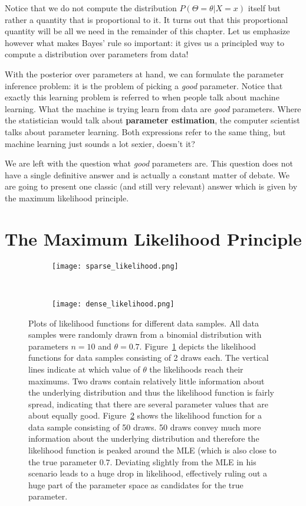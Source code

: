 Notice that we do not compute the distribution $ P(\Theta = \theta|X =x) $ itself but rather a quantity that is proportional to it. It turns out that this proportional quantity will be all
we need in the remainder of this chapter. Let us emphasize however what makes Bayes' rule so important: it gives us a principled way to compute a
distribution over parameters from data!

With the posterior over parameters at hand, we can formulate the parameter inference problem: it is the problem of picking
a \emph{good} parameter. Notice that exactly this learning problem is referred to when people talk about machine learning. What the machine is trying learn from data are \emph{good} parameters. Where the statistician would talk about
\textbf{parameter estimation}, the computer scientist talks about parameter learning. Both expressions refer to the same thing, but machine learning just sounds a lot
sexier, doesn't it?

We are left with the question what \emph{good} parameters are. This question does not have a single definitive answer and is actually a constant matter of debate. We
are going to present one classic (and still very relevant) answer which is given by the maximum likelihood principle.


\section{The Maximum Likelihood Principle}

\begin{figure}
\begin{subfigure}{.45\textwidth}
\texttt{[image: sparse\_likelihood.png]}
\caption{}
\label{fig:sparse_likelihood}
\end{subfigure}
~
\begin{subfigure}{.45\textwidth}
\texttt{[image: dense\_likelihood.png]}
\caption{}
\label{fig:dense_likelihood} 
\end{subfigure}
\caption{Plots of likelihood functions for different data samples. All data samples were randomly drawn
from a binomial distribution with parameters $ n=10 $ and $ \theta=0.7 $. Figure~\ref{fig:sparse_likelihood}
depicts the likelihood functions for data samples consisting of 2 draws each. The vertical lines indicate
at which value of $ \theta $ the likelihoods reach their maximums. Two draws contain relatively little
information about the underlying distribution and thus the likelihood function is fairly spread, indicating that there
are several parameter values that are about equally good.
Figure~\ref{fig:dense_likelihood}
shows the likelihood function for a data sample consisting of 50 draws. 50 draws convey much more information about the underlying distribution
and therefore the likelihood function is peaked around the MLE (which is also close to the true parameter $ 0.7 $. Deviating slightly from the MLE in his scenario
leads to a huge drop in likelihood, effectively ruling out a huge part of the parameter space as candidates for the true parameter.}
\label{fig:likelihood_plots}
\end{figure}

